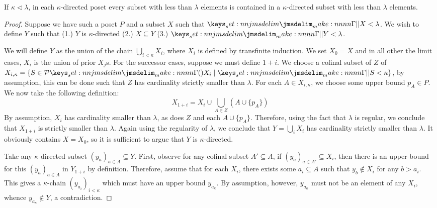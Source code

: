 \documentclass{amsart}
\begin{document}
\begin{lemma}
  \label{lem:accessible:sharp-directed-colim}
  If $\kappa \lhd \lambda$, in each $\kappa$-directed poset every subset with less than $\lambda$
  elements is contained in a $\kappa$-directed subset with less than $\lambda$ elements.
\end{lemma}
\begin{proof}
  Suppose we have such a poset $P$ and a subset $X$ such that $\verts{X} < \lambda$. We wish to
  define $Y$ such that (1.) $Y$ is $\kappa$-directed (2.) $X \subseteq Y$ (3.)
  $\verts{Y} < \lambda$.

  We will define $Y$ as the union of the chain $\bigcup_{i < \kappa} X_i$, where $X_i$ is defined by
  transfinite induction. We set $X_0 = X$ and in all other the limit cases, $X_i$ is the union of
  prior $X_j$s. For the successor cases, suppose we must define $1 + i$. We choose a cofinal subset
  of $Z$ of $X_{i,\kappa} = \{S \in \Pow{X_i} \mid \verts{S} < \kappa\}$, by assumption, this can be
  done such that $Z$ has cardinality strictly smaller than $\lambda$. For each $A \in X_{i,\kappa}$,
  we choose some upper bound $p_A \in P$. We now take the following definition:
  \[
    X_{1 + i} = X_i \cup \bigcup_{A \in Z} (A \cup \{p_A\})
  \]
  By assumption, $X_i$ has cardinality smaller than $\lambda$, as does $Z$ and each
  $A \cup \{p_A\}$. Therefore, using the fact that $\lambda$ is regular, we conclude that
  $X_{1 + i}$ is strictly smaller than $\lambda$. Again using the regularity of $\lambda$, we
  conclude that $Y = \bigcup_i X_i$ has cardinality strictly smaller than $\lambda$. It obviously
  contains $X = X_0$, so it is sufficient to argue that $Y$ is $\kappa$-directed.

  Take any $\kappa$-directed subset $(y_a)_{a \in A} \subseteq Y$. First, observe for any cofinal
  subset $A' \subseteq A$, if $(y_a)_{a \in A'} \subseteq X_i$, then there is an upper-bound for
  this $(y_a)_{a \in A}$ in $Y_{1 + i}$ by definition. Therefore, assume that for each $X_i$, there
  exists some $a_i \subseteq A$ such that $y_{b} \not\in X_i$ for any $b > a_i$. This gives a
  $\kappa$-chain $(y_{a_i})_{i < \kappa}$ which must have an upper bound $y_{a_\kappa}$. By
  assumption, however, $y_{a_\kappa}$ must not be an element of any $X_i$, whence
  $y_{a_\kappa} \not\in Y$, a contradiction.
\end{proof}
\end{document}
